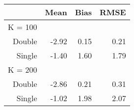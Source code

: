 \captionsetup[table]{labelformat=empty,skip=1pt}
\begin{longtable}{r|rrr}
\toprule
\multicolumn{1}{l}{} & Mean & Bias & RMSE \\ 
\midrule
\multicolumn{1}{l}{K = 100} \\ 
\midrule
Double & -2.92 & 0.15 & 0.21 \\ 
Single & -1.40 & 1.60 & 1.79 \\ 
\midrule
\multicolumn{1}{l}{K = 200} \\ 
\midrule
Double & -2.86 & 0.21 & 0.31 \\ 
Single & -1.02 & 1.98 & 2.07 \\ 
\bottomrule
\end{longtable}

